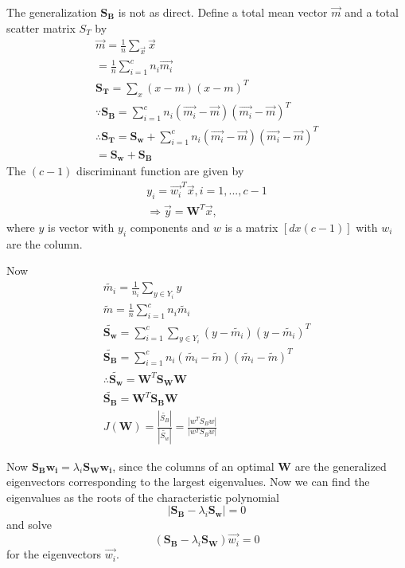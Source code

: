 \documentclass[11pt]{article}
\begin{document}
The generalization $\mathbf{S_B}$ is not as direct.  Define a total mean vector $\vec{m}$ and a total scatter matrix $S_T$ by 
\begin{eqnarray}
	\vec{m} = \frac{1}{n} \sum_{\vec{x}} \vec{x} \\
	= \frac{1}{n} \sum_{i=1}^{c} n_i \vec{m_i} \\
	\mathbf{S_T} = \sum _x (x - m)(x - m)^T  \\
	\because \mathbf{S_B} = \sum_{i=1}^c n_i (\vec{m_i} - \vec{m})( \vec{m_i} - \vec{m})^T \\
	\therefore \mathbf{S_T} = \mathbf{S_w} + \sum_{i=1}^c n_i (\vec{m_i} - \vec{m})( \vec{m_i} - \vec{m})^T \\
	= \mathbf{S_w} + \mathbf{S_B}
\end{eqnarray}
The $(c-1)$ discriminant function are given by 
\begin{eqnarray}
	y_i = \vec{w_i} ^T \vec{x} , i = 1, ..., c-1 \\
	\Rightarrow \vec{y} = \mathbf{W}^T \vec{x},
\end{eqnarray}
where $y$ is vector with $y_i$ components and $w$ is a matrix $[d x (c-1)]$ with $w_i$ are the column.

Now 
\begin{eqnarray}
	\tilde{m_i} = \frac{1}{n_i} \sum_{y\in Y_i} y \\
	\tilde{m} = \frac{1}{n} \sum_{i=1}^c n_i \tilde{m_i} \\
	\mathbf{\tilde{S_w}} = \sum_{i=1}^{c} \sum _{y \in Y_i} (y- \tilde{m_i})(y- \tilde{m_i})^T \\
	\mathbf{\tilde{S_B}} = \sum_{i=1}^c n_i (\tilde{m_i} - \tilde{m})(\tilde{m_i} - \tilde{m})^T \\
	\therefore \mathbf{\tilde{S_w}} = \mathbf{W}^T \mathbf{S_W} \mathbf{W} \\
	\mathbf{\tilde{S_B}}= \mathbf{W}^T \mathbf{S_B} \mathbf{W} \\
	J(\mathbf{W}) = \frac{| \tilde{S_B} |} {|\tilde{S_w}|} = \frac{|w^T S_B w |} {|w^T S_B w  |}
\end{eqnarray}

Now $\mathbf{S_B} \mathbf{w_i} = \lambda_i \mathbf{S_W} \mathbf{w_i} $, since the columns of an optimal $\mathbf{W}$ are the generalized eigenvectors corresponding to the largest eigenvalues.  Now we can find the eigenvalues as the roots of the characteristic polynomial 
\begin{equation}
| \mathbf{S_B} - \lambda_i \mathbf{S_w} | = 0
\end{equation}
and solve 
\begin{equation}
(\mathbf{S_B} - \lambda_i \mathbf{S_W}) \vec{w_i} = 0
\end{equation}
for the eigenvectors $\vec{w_i}$.
\end{document}

